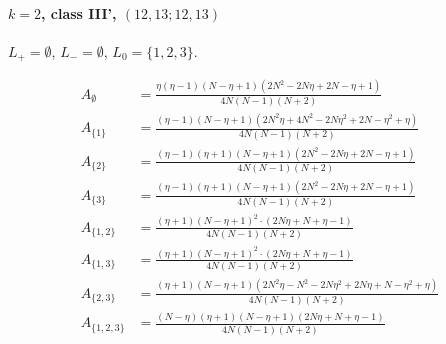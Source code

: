 \documentclass[11pt]{article}
\begin{document}
\paragraph{$k=2$, class III', $(12,13;12,13)$}

$L_+=\emptyset$, $L_-=\emptyset$, $L_0=\{1,2,3\}$.

\begin{align*}
  A_{\emptyset} &= \frac{\eta \left(\eta - 1\right) \left(N - \eta + 1\right) \left(2 N^{2} - 2 N \eta + 2 N - \eta + 1\right)}{4 N \left(N - 1\right) \left(N + 2\right)} \\
  A_{\{1\}} &= \frac{\left(\eta - 1\right) \left(N - \eta + 1\right) \left(2 N^{2} \eta + 4 N^{2} - 2 N \eta^{2} + 2 N - \eta^{2} + \eta\right)}{4 N \left(N - 1\right) \left(N + 2\right)} \\
  A_{\{2\}} &= \frac{\left(\eta - 1\right) \left(\eta + 1\right) \left(N - \eta + 1\right) \left(2 N^{2} - 2 N \eta + 2 N - \eta + 1\right)}{4 N \left(N - 1\right) \left(N + 2\right)} \\
  A_{\{3\}} &= \frac{\left(\eta - 1\right) \left(\eta + 1\right) \left(N - \eta + 1\right) \left(2 N^{2} - 2 N \eta + 2 N - \eta + 1\right)}{4 N \left(N - 1\right) \left(N + 2\right)} \\
  A_{\{1,2\}} &= \frac{\left(\eta + 1\right) \left(N - \eta + 1\right)^{2} \cdot \left(2 N \eta + N + \eta - 1\right)}{4 N \left(N - 1\right) \left(N + 2\right)} \\
  A_{\{1,3\}} &= \frac{\left(\eta + 1\right) \left(N - \eta + 1\right)^{2} \cdot \left(2 N \eta + N + \eta - 1\right)}{4 N \left(N - 1\right) \left(N + 2\right)} \\
  A_{\{2,3\}} &= \frac{\left(\eta + 1\right) \left(N - \eta + 1\right) \left(2 N^{2} \eta - N^{2} - 2 N \eta^{2} + 2 N \eta + N - \eta^{2} + \eta\right)}{4 N \left(N - 1\right) \left(N + 2\right)} \\
  A_{\{1,2,3\}} &= \frac{\left(N - \eta\right) \left(\eta + 1\right) \left(N - \eta + 1\right) \left(2 N \eta + N + \eta - 1\right)}{4 N \left(N - 1\right) \left(N + 2\right)} 
\end{align*}
\end{document}
